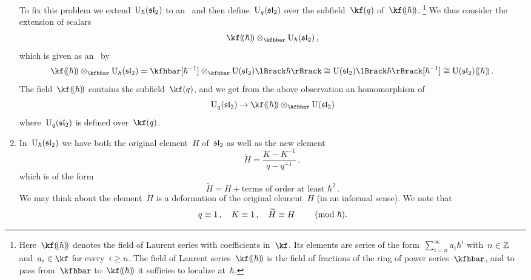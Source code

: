 \documentclass[a4paper, 11pt, oneside]{scrartcl}
\begin{document}
\begin{remark}
\begin{enumerate}
      To fix this problem we extend~$\operatorname{U}_{\hbar}(\mathfrak{sl}_2)$ to an~\algebra{$\lpower{\kf}{\hbar}$} and then define~$\operatorname{U}_q(\mathfrak{sl}_2)$ over the subfield~$\kf(q)$ of~$\lpower{\kf}{\hbar}$.%
      \footnote{
        Here~$\lpower{\kf}{\hbar}$ denotes the field of Laurent series with coefficients in~$\kf$.
        Its elements are series of the form~$\sum_{i=n}^\infty a_i \hbar^i$ with~$n \in \mathbb{Z}$ and~$a_i \in \kf$ for every~$i \geq n$.
        The field of Laurent series~$\lpower{\kf}{\hbar}$ is the field of fractions of the ring of power series~$\kfhbar$, and to pass from~$\kfhbar$ to~$\lpower{\kf}{\hbar}$ it sufficies to localize at~$\hbar$.
      }
      We thus consider the extension of scalars
      \[
        \lpower{\kf}{\hbar} \tensor_{\kfhbar} \Univ_{\hbar}(\sllie_2) \,,
      \]
      which is given as an~\module{$\lpower{\kf}{\hbar}$} by
      \[
        \lpower{\kf}{\hbar} \tensor_{\kfhbar} \Univ_{\hbar}(\sllie_2)
        =
        \kfhbar[\hbar^{-1}] \tensor_{\kfhbar} \power{\Univ(\sllie_2)}{\hbar}
        \cong
        \power{\Univ(\sllie_2)}{\hbar}[\hbar^{-1}]
        \cong
        \lpower{\Univ(\sllie_2)}{\hbar} \,.
      \]
      The field~$\lpower{\kf}{\hbar}$ contains the subfield~$\kf(q)$, and we get from the above observation an homomorphism of~
      \[
        \Univ_q(\sllie_2)
        \to
        \lpower{\kf}{\hbar} \tensor_{\kfhbar} \Univ(\sllie_2)
      \]
      where~$\operatorname{U}_q(\mathfrak{sl}_2)$ is defined over~$\kf(q)$.
    \item
      In~$\operatorname{U}_{\hbar}(\mathfrak{sl}_2)$ we have both the original element~$H$ of~$\mathfrak{sl}_2$ as well as the new element
      \[
        \widetilde{H}
        =
        \frac{K - K^{-1}}{q - q^{-1}} \,,
      \]
      which is of the form
      \[
        \widetilde{H}
        =
        H + \text{terms of order at least~$\hbar^2$} \,.
      \]
      We may think about the element~$\widetilde{H}$ is a deformation of the original element~$H$ (in an informal sense).
      We note that
      \[
        q \equiv 1 \,,
        \quad
        K \equiv 1 \,,
        \quad
        \widetilde{H} \equiv H
        \qquad
        \ (\mathrm{mod}\ \hbar).
      \]
  \end{enumerate}
\end{remark}

\end{document}
